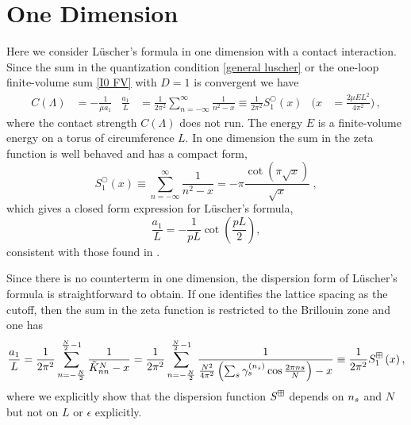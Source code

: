 \section{One Dimension}\label{sec:1D}

Here we consider L\"uscher's formula in one dimension with a contact interaction.
Since the sum in the quantization condition \eqref{general luscher} or the one-loop finite-volume sum \eqref{I0 FV} with $D=1$ is convergent we have %
\begin{align}\label{eq:tuning-1d}
    C(\Lambda)
    &=
            -\frac{1}{\mu a_{1}}
    &
    \frac{a_{1}}{L}
        &=
            \frac{1}{2 \pi^{2}}
            \sum_{n=-\infty}^{\infty} \frac{1}{n^{2}-x}
        \equiv
            \frac{1}{2 \pi^{2}}
            S^\bigcirc_{1}\left(x\right)
    &
    \Bigg(x
        &=
            \frac{2\mu E L^2}{4\pi^2}\Bigg)
    \, ,
\end{align}
where the contact strength $C(\Lambda)$ does not run.
The energy $E$ is a finite-volume energy on a torus of circumference $L$.
In one dimension the sum in the zeta function is well behaved and has a compact form,
\begin{equation}\label{eq:1d luscher}
S^\bigcirc_{1}(x) \equiv \sum_{n=-\infty}^{\infty} \frac{1}{n^{2}-x}=-\pi \frac{\cot (\pi \sqrt{x})}{\sqrt{x}}\ ,
\end{equation}
which gives a closed form expression for L\"uscher's formula,
\begin{equation}\label{eq:1d luscher constant}
\frac{a_{1}}{L} =-\frac{1}{pL}\cot\left(\frac{pL}{2}\right),
\end{equation}
consistent with those found in \cite{Luscher:1990ck,Zhu:2019dho}.

Since there is no counterterm in one dimension, the dispersion form of L\"uscher's formula is straightforward to obtain.  If one identifies the lattice spacing as the cutoff, then the sum in the zeta function is restricted to the Brillouin zone and one has
\begin{equation}
    \frac{a_{1}}{L}
    =
    \frac{1}{2 \pi^{2}} \sum_{n=-\frac{N}{2}}^{\frac{N}{2}-1} \frac{1}{\tilde{K}^N_{nn}-x}
    =
    \frac{1}{2 \pi^{2}} \sum_{n=-\frac{N}{2}}^{\frac{N}{2}-1} \frac{1}{\frac{N^2}{4\pi^2}\left(\sum_{s}\gamma_s^{({n_s})}\cos\frac{2\pi n s}{N}\right)-x}
    \equiv
    \frac{1}{2 \pi^{2}} S^{\boxplus}_{1}\left(x\right),\label{eq:1d dispersion luscher}
\end{equation}
where we explicitly show that the dispersion function $S^{\boxplus}$ depends on ${n_s}$ and $N$ but not on $L$ or $\epsilon$ explicitly.

